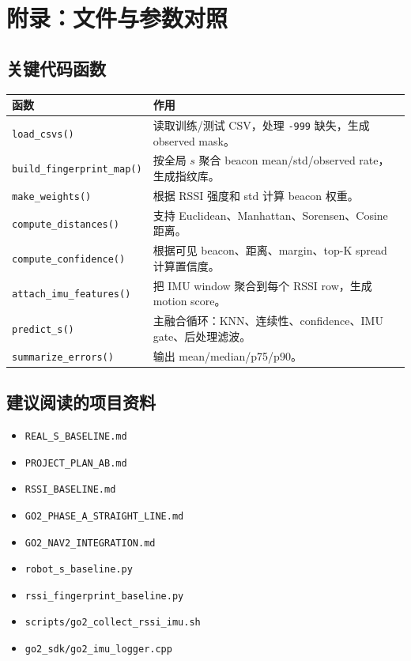 \documentclass[11pt,a4paper,openany]{report}
\newcommand{\code}[1]{\nolinkurl{#1}}
\newcommand{\file}[1]{\nolinkurl{#1}}
\begin{document}
\chapter{附录：文件与参数对照}

\section{关键代码函数}

\begin{longtable}{p{}p{}}
\toprule
函数 & 作用 \\
\midrule
\code{load_csvs()} & 读取训练/测试 CSV，处理 \code{-999} 缺失，生成 observed mask。 \\
\code{build_fingerprint_map()} & 按全局 \(s\) 聚合 beacon mean/std/observed rate，生成指纹库。 \\
\code{make_weights()} & 根据 RSSI 强度和 std 计算 beacon 权重。 \\
\code{compute_distances()} & 支持 Euclidean、Manhattan、Sorensen、Cosine 距离。 \\
\code{compute_confidence()} & 根据可见 beacon、距离、margin、top-K spread 计算置信度。 \\
\code{attach_imu_features()} & 把 IMU window 聚合到每个 RSSI row，生成 motion score。 \\
\code{predict_s()} & 主融合循环：KNN、连续性、confidence、IMU gate、后处理滤波。 \\
\code{summarize_errors()} & 输出 mean/median/p75/p90。 \\
\bottomrule
\end{longtable}

\section{建议阅读的项目资料}

\begin{itemize}
  \item \file{REAL_S_BASELINE.md}
  \item \file{PROJECT_PLAN_AB.md}
  \item \file{RSSI_BASELINE.md}
  \item \file{GO2_PHASE_A_STRAIGHT_LINE.md}
  \item \file{GO2_NAV2_INTEGRATION.md}
  \item \file{robot_s_baseline.py}
  \item \file{rssi_fingerprint_baseline.py}
  \item \file{scripts/go2_collect_rssi_imu.sh}
  \item \file{go2_sdk/go2_imu_logger.cpp}
\end{itemize}
\end{document}
